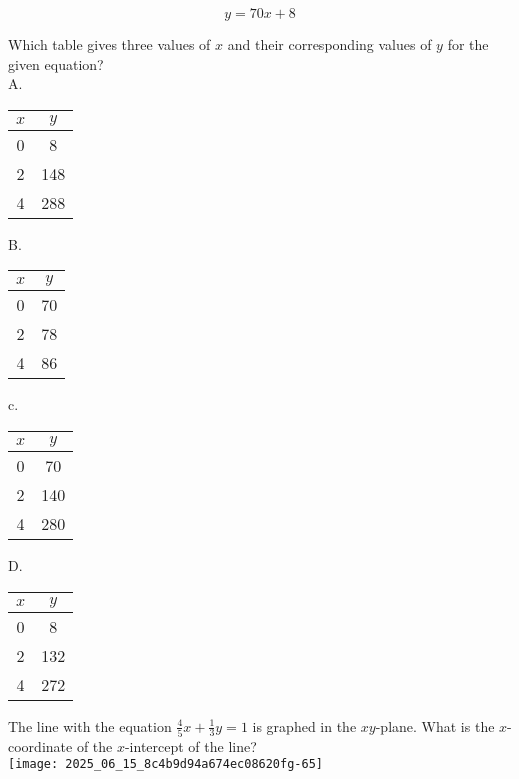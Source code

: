 $$
y=70 x+8
$$

Which table gives three values of $x$ and their corresponding values of $y$ for the given equation?\\
A.

\begin{center}
\begin{tabular}{|c|c|}
\hline
$x$ & $y$ \\
\hline
0 & 8 \\
\hline
2 & 148 \\
\hline
4 & 288 \\
\hline
\end{tabular}
\end{center}

B.

\begin{center}
\begin{tabular}{|c|c|}
\hline
$x$ & $y$ \\
\hline
0 & 70 \\
\hline
2 & 78 \\
\hline
4 & 86 \\
\hline
\end{tabular}
\end{center}

c.

\begin{center}
\begin{tabular}{|c|c|}
\hline
$x$ & $y$ \\
\hline
0 & 70 \\
\hline
2 & 140 \\
\hline
4 & 280 \\
\hline
\end{tabular}
\end{center}

D.

\begin{center}
\begin{tabular}{|c|c|}
\hline
$x$ & $y$ \\
\hline
0 & 8 \\
\hline
2 & 132 \\
\hline
4 & 272 \\
\hline
\end{tabular}
\end{center}

The line with the equation $\frac{4}{5} x+\frac{1}{3} y=1$ is graphed in the $x y$-plane. What is the $x$-coordinate of the $x$-intercept of the line?\\
\texttt{[image: 2025\_06\_15\_8c4b9d94a674ec08620fg-65]}


